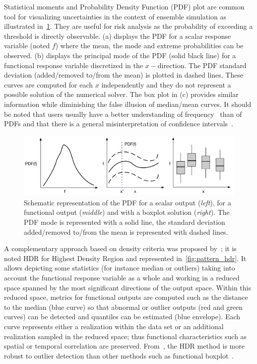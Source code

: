 Statistical moments and Probability Density Function (PDF) plot are common tool for visualizing uncertainties in the context of ensemble simulation as illustrated in~\cref{fig:pattern_pdf}. They are useful for risk analysis as the probability of exceeding a threshold is directly observable. (a) displays the PDF for a scalar response variable (noted $f$) where the mean, the mode and extreme probabilities can be observed. (b) displays the principal mode of the PDF (solid black line) for a functional response variable discretized in the $x-$direction. The PDF standard deviation (added/removed to/from the mean) is plotted in dashed lines. These curves are computed for each $x$ independently and they do not represent a possible solution of the numerical solver. The box plot in (c) provides similar information while diminishing the false illusion of median/mean curves. It should be noted that users usually have a better understanding of frequency~\citep{Gigerenzer1995} than of PDFs and that there is a  general misinterpretation of confidence intervals~\citep{Belia2005}.
\begin{figure}[!h]
\centering
\includegraphics[width=\linewidth,keepaspectratio]{fig/literature/patterns_pdf.pdf}
\caption{Schematic representation of the PDF for a scalar output (\emph{left}), for a functional output (\emph{middle}) and with a boxplot solution (\emph{right}). The PDF mode is represented with a solid line, the standard deviation added/removed to/from the mean is represented with dashed lines.}
\label{fig:pattern_pdf}
\end{figure}

A complementary approach based on density criteria was proposed by~\citep{Hyndman2009,Sun2011}; it is noted HDR for Highest Density Region and represented in~\cref{fig:pattern_hdr}. It allows depicting some statistics (for instance median or outliers) taking into account the functional response variable as a whole and working in a reduced space spanned by the most significant directions of the output space. Within this reduced space, metrics for functional outputs are computed such as the distance to the median (blue curve) so that abnormal or outlier outputs (red and green curves) can be detected and quantiles can be estimated (blue envelope). Each curve represents either a realization within the data set or an additional realization sampled in the reduced space; thus functional characteristics such as spatial or temporal correlation are preserved.  From~\citep{Popelin2013,Ribes2015}, the HDR method is more robust to outlier detection than other methods such as functional boxplot~\citep{Sun2011,Whitaker2013}.

